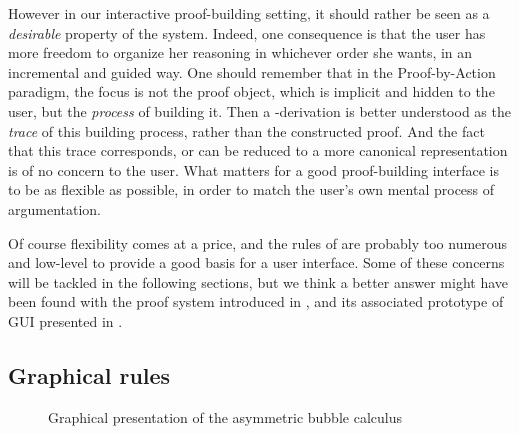 However in our interactive proof-building setting, it should rather be seen as a
\emph{desirable} property of the system. Indeed, one consequence is that the
user has more freedom to organize her reasoning in whichever order she wants, in
an incremental and guided way. One should remember that in the Proof-by-Action
paradigm, the focus is not the proof object, which is implicit and hidden to the
user, but the \emph{process} of building it. Then a -derivation is
better understood as the \emph{trace} of this building process, rather than the
constructed proof. And the fact
that this trace corresponds, or can be reduced to a more canonical
representation is of no concern to the user. What matters for a good
proof-building interface is to be as flexible as possible, in order to match the
user's own mental process of argumentation.

Of course flexibility comes at a price, and the rules of  are probably
too numerous and low-level to provide a good basis for a user interface. Some of
these concerns will be tackled in the following sections, but we think a better
answer might have been found with the proof system introduced in
, and its associated prototype of GUI presented in
.


\subsection{Graphical rules}

\begin{figure*}
  
  \caption{Graphical presentation of the asymmetric bubble calculus }
\end{figure*}

